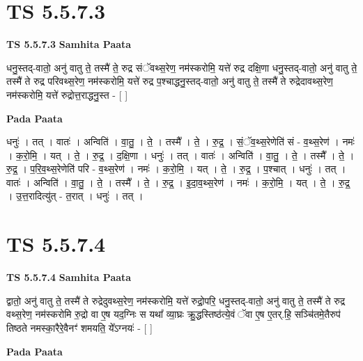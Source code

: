 \documentclass[17pt]{extarticle}
\begin{document}

\section{ TS 5.5.7.3 }

\textbf{TS 5.5.7.3 } \newline
\textbf{Samhita Paata} \newline

धनु॒स्तद्-वातो॒ अनु॑ वातु ते॒ तस्मै॑ ते॒ रुद्र संॅवथ्स॒रेण॒ नम॑स्करोमि॒ यत्ते॑ रुद्र दक्षि॒णा धनु॒स्तद्-वातो॒ अनु॑ वातु ते॒ तस्मै॑ ते रुद्र परिवथ्स॒रेण॒ नम॑स्करोमि॒ यत्ते॑ रुद्र प॒श्चाद्धनु॒स्तद्-वातो॒ अनु॑ वातु ते॒ तस्मै॑ ते रुद्रेदावथ्स॒रेण॒ नम॑स्करोमि॒ यत्ते॑ रुद्रोत्त॒राद्धनु॒स्त - [  ] \newline

\textbf{Pada Paata} \newline

धनुः॑ । तत् । वातः॑ । अन्विति॑ । वा॒तु॒ । ते॒ । तस्मै᳚ । ते॒ । रु॒द्र॒ । सं॒ॅव॒थ्स॒रेणेति॑ सं - व॒थ्स॒रेण॑ । नमः॑ । क॒रो॒मि॒ । यत् । ते॒ । रु॒द्र॒ । द॒क्षि॒णा । धनुः॑ । तत् । वातः॑ । अन्विति॑ । वा॒तु॒ । ते॒ । तस्मै᳚ । ते॒ । रु॒द्र॒ । प॒रि॒व॒थ्स॒रेणेति॑ परि - व॒थ्स॒रेण॑ । नमः॑ । क॒रो॒मि॒ । यत् । ते॒ । रु॒द्र॒ । प॒श्चात् । धनुः॑ । तत् । वातः॑ । अन्विति॑ । वा॒तु॒ । ते॒ । तस्मै᳚ । ते॒ । रु॒द्र॒ । इ॒दा॒व॒थ्स॒रेण॑ । नमः॑ । क॒रो॒मि॒ । यत् । ते॒ । रु॒द्र॒ । उ॒त्त॒रादित्यु॑त् - त॒रात् । धनुः॑ । तत् ।  \newline





\section{ TS 5.5.7.4 }

\textbf{TS 5.5.7.4 } \newline
\textbf{Samhita Paata} \newline

द्वातो॒ अनु॑ वातु ते॒ तस्मै॑ ते रुद्रेदुवथ्स॒रेण॒ नम॑स्करोमि॒ यत्ते॑ रुद्रो॒परि॒ धनु॒स्तद्-वातो॒ अनु॑ वातु ते॒ तस्मै॑ ते रुद्र वथ्स॒रेण॒ नम॑स्करोमि रु॒द्रो वा ए॒ष यद॒ग्निः स यथा᳚ व्या॒घ्रः क्रु॒द्धस्तिष्ठ॑त्ये॒वं ॅवा ए॒ष ए॒तर्.हि॒ सञ्चि॑तमे॒तैरुप॑ तिष्ठते नमस्का॒रैरे॒वैनꣳ॑ शमयति॒ ये᳚ऽग्नयः॑ - [  ] \newline

\textbf{Pada Paata} \newline
\end{document}
